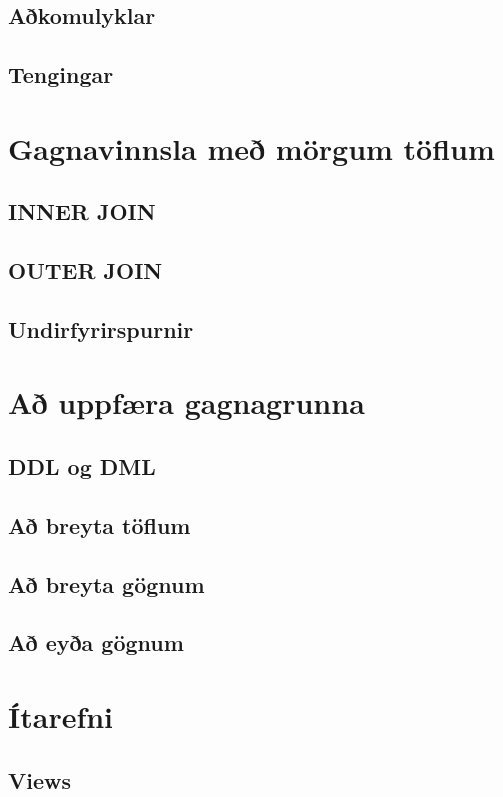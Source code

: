 \documentclass[nohyper,notoc,justified]{tufte-book}
\begin{document}
\section{Aðkomulyklar} %
\section{Tengingar} %

\chapter{Gagnavinnsla með mörgum töflum}
\section{INNER JOIN}
\section{OUTER JOIN}
\section{Undirfyrirspurnir}

\chapter{Að uppfæra gagnagrunna}
\label{kafli:uppfaera}
\section{DDL og DML}
\section{Að breyta töflum}
\section{Að breyta gögnum}
\section{Að eyða gögnum}

\chapter{Ítarefni}
\label{kafli:itarefni}
\section{Views}
\end{document}
